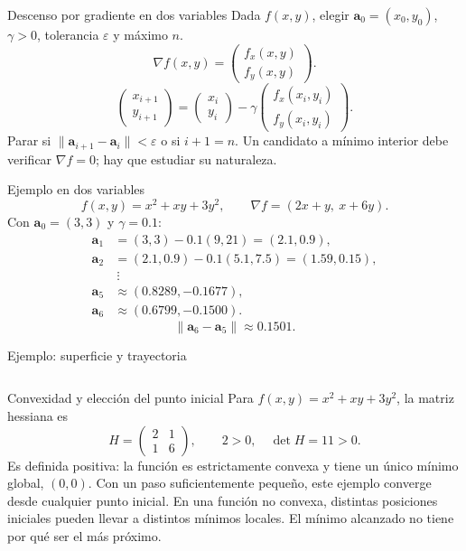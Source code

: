 \documentclass[main.tex]{subfiles}
\begin{document}
\begin{frame}[t]{Descenso por gradiente en dos variables}
\small Dada $f(x,y)$, elegir $\boldsymbol{a}_0=(x_0,y_0)$, $\gamma>0$, tolerancia $\varepsilon$ y máximo $n$.
\[\nabla f(x,y)=\begin{pmatrix}f_x(x,y)\\f_y(x,y)\end{pmatrix}.\]
\[\begin{pmatrix}x_{i+1}\\y_{i+1}\end{pmatrix}
=\begin{pmatrix}x_i\\y_i\end{pmatrix}
-\gamma\begin{pmatrix}f_x(x_i,y_i)\\f_y(x_i,y_i)\end{pmatrix}.\]
Parar si $\|\boldsymbol{a}_{i+1}-\boldsymbol{a}_i\|<\varepsilon$ o si $i+1=n$.
\medskip Un candidato a mínimo interior debe verificar $\nabla f=0$; hay que estudiar su naturaleza.
\end{frame}
\begin{frame}[t]{Ejemplo en dos variables}
\small
\[f(x,y)=x^2+xy+3y^2,\qquad\nabla f=(2x+y,\ x+6y).\]
Con $\boldsymbol{a}_0=(3,3)$ y $\gamma=0.1$:
\begin{align*}
\boldsymbol{a}_1&=(3,3)-0.1(9,21)=(2.1,0.9),\\
\boldsymbol{a}_2&=(2.1,0.9)-0.1(5.1,7.5)=(1.59,0.15),\\
&\ \vdots\\
\boldsymbol{a}_5&\approx(0.8289,-0.1677),\\
\boldsymbol{a}_6&\approx(0.6799,-0.1500).
\end{align*}
\[\|\boldsymbol{a}_6-\boldsymbol{a}_5\|\approx0.1501.\]
\end{frame}
\begin{frame}[t]{Ejemplo: superficie y trayectoria}
\begin{columns}\end{columns}
\end{frame}
\begin{frame}[t]{Convexidad y elección del punto inicial}
\small
Para $f(x,y)=x^2+xy+3y^2$, la matriz hessiana es
\[H=\begin{pmatrix}2&1\\1&6\end{pmatrix},\qquad 2>0,\quad\det H=11>0.\]
Es definida positiva: la función es estrictamente convexa y tiene un único mínimo global, $(0,0)$.
\medskip
Con un paso suficientemente pequeño, este ejemplo converge desde cualquier punto inicial.
\medskip
En una función no convexa, distintas posiciones iniciales pueden llevar a distintos mínimos locales. El mínimo alcanzado no tiene por qué ser el más próximo.
\end{frame}
\end{document}
